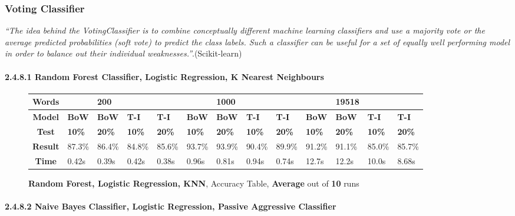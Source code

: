 \documentclass{article}
\begin{document}
\subsubsection{Voting Classifier}
	\par \textit{``The idea behind the VotingClassifier is to combine conceptually different machine learning classifiers and use a majority vote or the average predicted probabilities (soft vote) to predict the class labels. Such a classifier can be useful for a set of equally well performing model in order to balance out their individual weaknesses.''}.(Scikit-learn)
	\paragraph{2.4.8.1 Random Forest Classifier, Logistic Regression, K Nearest Neighbours}
	\begin{figure}[!h]
		\begin{tabular}{||c||l|l|l|l||l|l|l|l||l|l|l|l||}
			\hline
			\textbf{Words} &  & \textbf{200} & & & &\textbf{1000} & & & & \textbf{19518} &  & \\ \hline 
			\textbf{Model} & \textbf{BoW} & \textbf{BoW} & \textbf{T-I} & \textbf{T-I} &\textbf{BoW} & \textbf{BoW} & \textbf{T-I} & \textbf{T-I} & \textbf{BoW} & \textbf{BoW} & \textbf{T-I} & \textbf{T-I}\\ \hline
			\textbf{Test} & \textbf{10\%} & \textbf{20\%} & \textbf{10\%} & \textbf{20\%} & \textbf{10\%} & \textbf{20\%} & \textbf{10\%} & \textbf{20\%} & \textbf{10\%} & \textbf{20\%} & \textbf{10\%} & \textbf{20\%} \\ \hline \hline  
			\textbf{Result} & 87.3\% & 86.4\% & 84.8\% & 85.6\% & 93.7\% & 93.9\% & 90.4\% & 89.9\% & 91.2\% & 91.1\% & 85.0\% & 85.7\% \\ \hline 
			\textbf{Time} &0.42s & 0.39s & 0.42s & 0.38s & 0.96s &0.81s & 0.94s & 0.74s & 12.7s &12.2s & 10.0s &8.68s \\ \hline 
		\end{tabular}
		\caption{\textbf{Random Forest, Logistic Regression, KNN}, Accuracy Table, \textbf{Average} out of \textbf{10} runs}
	\end{figure}
	\paragraph{2.4.8.2 Naive Bayes Classifier, Logistic Regression, Passive Aggressive Classifier}
	
\end{document}
